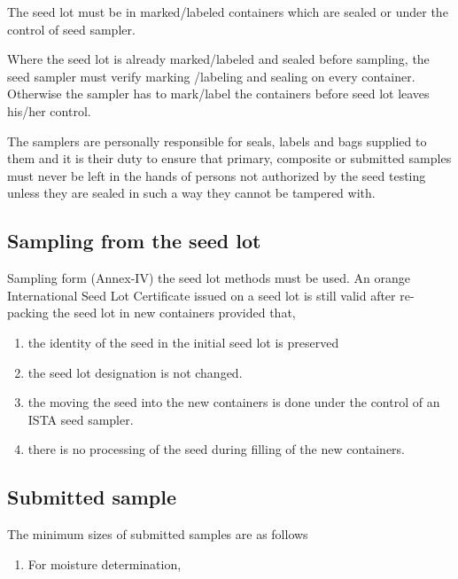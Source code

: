 \documentclass[
]{book}
\providecommand{\tightlist}{%
  \setlength{\itemsep}{0pt}\setlength{\parskip}{0pt}}
\begin{document}
The seed lot must be in marked/labeled containers which are sealed or under the control of seed sampler.

Where the seed lot is already marked/labeled and sealed before sampling, the seed sampler must verify marking /labeling and sealing on every container. Otherwise the sampler has to mark/label the containers before seed lot leaves his/her control.

The samplers are personally responsible for seals, labels and bags supplied to them and it is their duty to ensure that primary, composite or submitted samples must never be left in the hands of persons not authorized by the seed testing unless they are sealed in such a way they cannot be tampered with.

\hypertarget{sampling-from-the-seed-lot}{%
\subsection{Sampling from the seed lot}\label{sampling-from-the-seed-lot}}

Sampling form (Annex-IV) the seed lot methods must be used. An orange International Seed Lot Certificate issued on a seed lot is still valid after re-packing the seed lot in new containers provided that,

\begin{enumerate}
\def\labelenumi{\alph{enumi})}
\item
  the identity of the seed in the initial seed lot is preserved
\item
  the seed lot designation is not changed.
\item
  the moving the seed into the new containers is done under the control of an ISTA seed sampler.
\item
  there is no processing of the seed during filling of the new containers.
\end{enumerate}

\hypertarget{submitted-sample-1}{%
\subsection{Submitted sample}\label{submitted-sample-1}}

The minimum sizes of submitted samples are as follows

\begin{enumerate}
\def\labelenumi{\alph{enumi})}
\tightlist
\item
  For moisture determination,
\end{enumerate}
\end{document}

